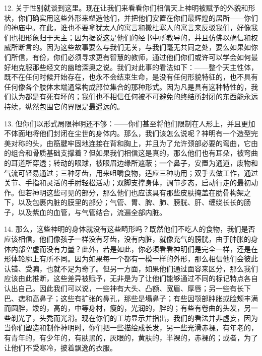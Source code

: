 12. 关于性别就谈到这里。现在让我们来看看你们相信天上神明被赋予的外貌和形状，你们确实用这些外形来塑造他们，并把他们安置在你们最辉煌的居所——你们的神庙中。在此，谁也不要拿犹太人的寓言和撒杜塞人的寓言来反驳我们，好像我们也把形象归于天主；因为据说这是他们的经书中所教导的，并且仿佛以确信和权威所断言的。因为这些故事要么与我们无关，与我们毫无共同之处，要么如果如你们所信，有份，你们必须寻求更有智慧的教师，通过他们你们或许可以学会如何最好地克服那些经文的幽暗深奥之说。我们对此事的看法如下：——整个天主性体，既不在任何时候开始存在，也永不会结束生命，是没有任何形貌特征的，也不具有任何像各个肢体末端通常构成部位集合的那种形式。因为凡是具有这种特性的，我们认为都是有死有坏的；我们也不相信任何被不可避免的终结所封闭的东西能永远持续，纵然包围它的界限是最遥远的。\par

13. 但你们以形式局限神明还不够：——你们甚至将他们限制在人形上，并且更加不体面地将他们封闭在尘世的身体内。那么，我们该怎么说呢？神明有一个造型完美对称的头，由筋腱牢固地连接在背和胸上，并且为了允许颈部必要的弯曲，它由的组合和骨质基础支撑着？但如果我们相信这是真的，那么他们也有耳朵，被弯曲的耳道所穿透；转动的眼球，被眼眉边缘所遮蔽；一个鼻子，安置为通道，废物和气流可轻易通过；三种牙齿，用来咀嚼食物，适应三种功用；双手去做工作，通过关节、手指和灵活的手肘轻松活动；双脚支撑身体，调节步态，启动行走的最初动作。但若神明这些可见的部分，那么他们也应该具有那些皮肤掩盖在肋骨构架之下，以及包裹内脏的膜里的部分；气管、胃、脾、肺、膀胱、肝、缠绕长长的肠子，以及紫血的血管，与气管结合，流遍全部内脏。\par

14. 那么，这些神明的身体就没有这些畸形吗？既然他们不吃人的食物，我们是否应该相信，他们像孩子一样没有牙齿，没有内脏，就像充气的膀胱，由于肿胀的身体内部空虚而没有力量？此外，若是如此，你必须看看神明们是完全一样，还是在形体轮廓上有所不同。因为如果每一个都有一模一样的外形，那么相信他们会彼此认错、受骗，也就不足为奇了。但另一方面，如果他们通过面容来区分，那么我们应该由此推断，这些差异被赋予，无非是为了让他们能够通过不同的标记特点各自认出自己。因此我们可以说，一些神有大头、凸额、宽眉、厚唇；另一些有长下巴、痣和高鼻子；这些有扩张的鼻孔，那些是塌鼻子；有些因颚部肿胀或脸颊丰满而圆胖，矮的，高的，中等身材，瘦的，光润的，胖的；有些有卷曲的头发，另一些剃光了，头秃而光滑。现在你们的工坊显示并指出，我们的看法并非虚妄，因为当你们塑造和制作神明时，你们把一些描绘成长发，另一些光滑赤裸，有年老的，有青年的，有少年的，有肤黑的，灰眼的，黄肤的，半裸的，赤裸的；或者，为了让他们不受寒冷，披着飘逸的衣服。\par

